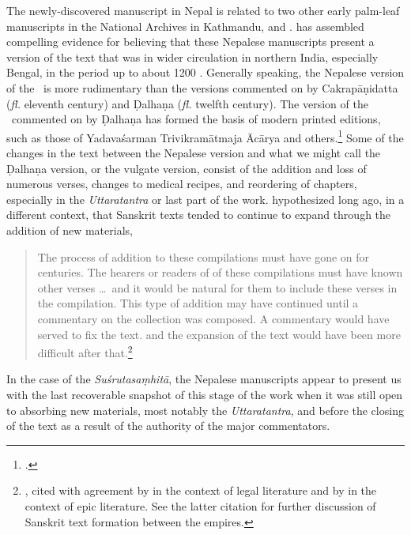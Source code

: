 The newly-discovered manuscript in Nepal is related to two other early palm-leaf
manuscripts in the National Archives in Kathmandu, 
and . \citet{kleb-2010,kleb-2021b} has assembled
compelling evidence for believing that these Nepalese manuscripts present a
version of the text that was in wider circulation in northern India, especially
Bengal, in the period up to about 1200 \CE. Generally speaking, the Nepalese
version of the \SS\ is more rudimentary than the versions commented on by
Cakrapāṇidatta (\emph{fl.} eleventh century) and Ḍalhaṇa (\emph{fl.} twelfth
century).  The version of the \SS\ commented on by Ḍalhaṇa has formed the basis of
modern printed editions, such as those of Yadavaśarman Trivikramātmaja Ācārya and
others.\footcite{susr-trikamji1,vulgate,shar-susr}  Some of the changes in the
text between the Nepalese version and what we might call the Ḍalhaṇa version, or
the vulgate version, consist of the addition and loss of numerous verses, changes
to medical recipes, and reordering of chapters, especially in the \emph{Uttaratantra} or
last part of the work.  \citeauthor{lari-2003} hypothesized long ago, in a
different context, that Sanskrit texts tended to continue to expand through the
addition of new materials,
\begin{quote}
The process of addition to these compilations must have gone on for centuries. The
hearers or readers of of these compilations must have known other verses \ldots\
and it would be natural for them to include these verses in the compilation. This
type of  addition may have continued until a commentary on the collection was
composed.     A commentary would have served to fix the text. and the expansion of
the text   would have been more difficult after
that.\footnote{\cite[xii]{lari-2003}, cited with agreement by
    \citet[51]{oliv-manu} in the context of legal literature and by
    \citet[62--63]{bron-how} in the context of epic literature.  See the latter
    citation for further discussion of Sanskrit text formation between the empires.}
\end{quote}
In the case of the \emph{Suśrutasaṃhitā}, the Nepalese manuscripts appear to present us 
with the last recoverable snapshot of this stage of the work when it was still open to 
absorbing new materials, most notably the \emph{Uttaratantra}, and before the closing of 
the text 
as a result of the authority of the major commentators.


